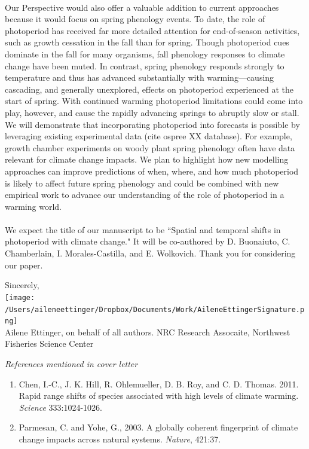 \documentclass[11pt,a4paper]{letter}
\begin{document}
\begin{letter}{}
\\
Our Perspective would also offer a valuable addition to current approaches because it would focus on spring phenology events. To date, the role of photoperiod has received far more detailed attention for end-of-season activities, such as growth cessation in the fall than for spring. Though photoperiod cues dominate in the fall for many organisms, fall phenology responses to climate change have been muted. In contrast, spring phenology responds strongly to temperature and thus has advanced substantially with warming---causing cascading, and generally unexplored, effects on photoperiod experienced at the start of spring. With continued warming photoperiod limitations could come into play, however, and cause the rapidly advancing springs to abruptly slow or stall. We will demonstrate that incorporating photoperiod into forecasts is possible by leveraging existing experimental data (cite ospree XX database). For example, growth chamber experiments on woody plant spring phenology often have data relevant for climate change impacts. We plan to highlight how new modelling approaches can improve predictions of when, where, and how much photoperiod is likely to affect future spring phenology and could be combined with new empirical work to advance our understanding of the role of photoperiod in a warming world.%
\\
\\
We expect the title of our manuscript to be ``Spatial and temporal shifts in photoperiod with climate change."  It will be co-authored by D. Buonaiuto, C. Chamberlain, I. Morales-Castilla, and E. Wolkovich. Thank you for considering our paper.

Sincerely,\\

\texttt{[image: /Users/aileneettinger/Dropbox/Documents/Work/AileneEttingerSignature.png]} \\
Ailene Ettinger, on behalf of all authors.
NRC Research Assocaite, Northwest Fisheries Science Center

\noindent \emph{References mentioned in cover letter}
\begin{footnotesize}
\begin{enumerate}
\item Chen, I.-C., J. K. Hill, R. Ohlemueller, D. B. Roy, and C. D. Thomas. 2011. Rapid range shifts of species associated with high levels of climate warming.  \emph{Science} 333:1024-1026.

\item Parmesan, C. and Yohe, G., 2003. A globally coherent fingerprint of climate change impacts across natural systems.  \emph{Nature}, 421:37.


\end{enumerate}
\end{footnotesize}
\end{letter}
\end{document}
